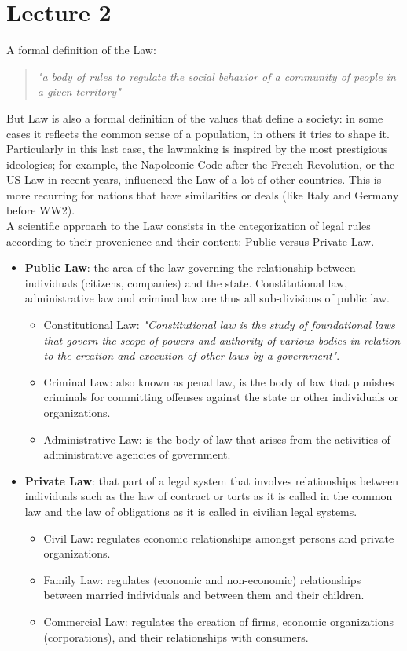 \documentclass[a4paper, 10pt, titlepage]{article}
\begin{document}
\section{Lecture 2}
A formal definition of the Law: 
\begin{quote}
\textit{"a body of rules to
regulate the social behavior of a community of people in a
given territory"} 
\end{quote}
But Law is also a formal definition of the values that define a society: in some cases it reflects the common sense of a population, in others it tries to shape it. Particularly in this last case, the lawmaking is inspired by the most prestigious ideologies; for example, the Napoleonic Code after the French Revolution, or the US Law in recent years, influenced the Law of a lot of other countries. This is more recurring for nations that have similarities or deals (like Italy and Germany before WW2). \\
A scientific approach to the Law consists in the categorization of legal rules according to their provenience and their content: Public versus Private Law.
\begin{itemize}
\item \textbf{Public Law}: the area of the law governing the relationship between individuals (citizens, companies) and the state. Constitutional law, administrative law and criminal law are thus all sub-divisions of public law.
	\begin{itemize}
	\item Constitutional Law: \textit{"Constitutional law is the study of foundational laws that govern the scope of powers and  authority of various bodies in relation to the creation and execution of other laws by a government"}.
	\item Criminal Law: also known as penal law, is the body of law that punishes criminals for committing offenses against the state or other individuals or organizations.
	\item Administrative Law: is the body of law that arises from the activities of administrative agencies of government.
	\end{itemize}
\item \textbf{Private Law}: that part of a legal system that  involves relationships between individuals such as the law of contract or torts as it is called in the common law and the law of obligations as it is called in civilian legal systems.
	\begin{itemize}
	\item Civil Law: regulates economic relationships amongst persons and private organizations.
	\item Family Law: regulates (economic and non-economic) relationships between married individuals and between them and their children.
	\item Commercial Law: regulates the creation of firms, economic organizations (corporations), and their relationships with consumers.
	\end{itemize}
\end{itemize}
\end{document}
